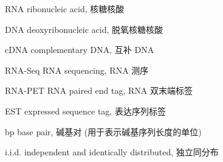 \begin{denotation}

\item[RNA] ribonucleic acid, 核糖核酸

\item[DNA] deoxyribonucleic acid, 脱氧核糖核酸

\item[cDNA] complementary DNA, 互补 DNA

\item[RNA-Seq] RNA sequencing, RNA 测序

\item[RNA-PET] RNA paired end tag, RNA 双末端标签

\item[EST] expressed sequence tag, 表达序列标签

\item[bp] base pair, 碱基对 (用于表示碱基序列长度的单位)

\item[i.i.d.] independent and identically distributed, 独立同分布

\end{denotation}
